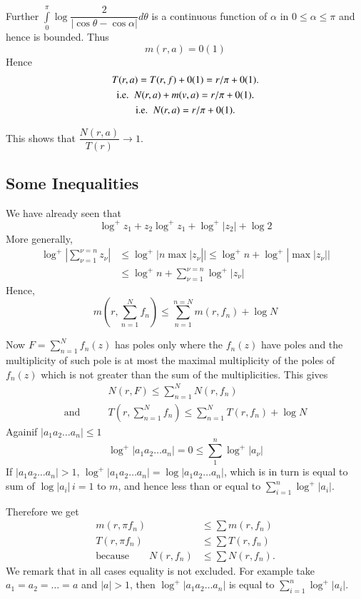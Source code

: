 Further\pageoriginale \;
$\int\limits^{\pi}_{0}\log\dfrac{2}{|\cos\theta-\cos\alpha|}d\theta$ \;
is a continuous function of $\alpha$ in $0\leq \alpha\leq\pi$ and
hence is bounded. Thus
$$
m(r,a)=0(1)
$$
Hence
\begin{gather*}
T(r,a)=T(r,f)+0(1)=r/\pi+0(1).\\
\text{{i.e.}\kern.3em\ } N(r,a)+m(v,a)=r/\pi+0(1).\\
\text{{i.e.}\kern.3em\ } N(r,a)=r/\pi+0(1).
\end{gather*}

This shows that $\dfrac{N(r,a)}{T(r)}\to 1$.

\subsection{Some Inequalities}\label{part1-sec1.4}

We have already seen that
$$
\log^{+}z_{1}+z_{2}\log^{+}z_{1}+\log^{+}|z_{2}|+\log 2
$$
More generally,
\begin{align*}
\log^{+}\left|\sum^{\nu=n}_{\nu=1}z_{\nu}\right| &\leq
\log^{+}|n\max|z_{\nu}|\Big|\leq \log^{+}n+\log^{+}|\max |z_{\nu}|\Big|\\
&\leq \log^{+}n+\sum^{\nu=n}_{\nu=1}\log^{+}|z_{\nu}|
\end{align*}
Hence,
$$
m\left(r,\sum^{N}_{n=1}f_{n}\right)\leq \sum^{n=N}_{n=1}m(r,f_{n})+\log N
$$

Now $F=\sum\limits^{N}_{n=1}f_{n}(z)$ has poles only where the
$f_{n}(z)$ have poles and the multiplicity of such pole is at most the
maximal multiplicity of the poles of $f_{n}(z)$ which is not greater
than the sum of the multiplicities. This gives
\begin{align*}
& N(r,F)\leq \sum^{N}_{n=1}N(r,f_{n})\\
\text{and}\qquad & T\left(r,\sum^{N}_{n=1}f_{n}\right)\leq
\sum^{N}_{n=1}T(r,f_{n})+\log N
\end{align*}
Again\pageoriginale if $|a_{1}a_{2}\ldots a_{n}|\leq 1$
$$
\log^{+}|a_{1}a_{2}\ldots a_{n}|=0\leq \sum^{n}_{1}\log^{+}|a_{\nu}|
$$
If $|a_{1}a_{2}\ldots a_{n}|>1$, $\log^{+}|a_{1}a_{2}\ldots
a_{n}|=\log |a_{1}a_{2}\ldots a_{n}|$, which is in turn is equal to sum
of $\log |a_{i}|\,i=1$ to $m$, and hence less than or equal to
$\sum\limits^{n}_{i=1}\log^{+}|a_{i}|$.

Therefore we get
\begin{align*}
m(r,\pi f_{n}) &\leq \sum m(r,f_{n})\\
T(r,\pi f_{n}) &\leq \sum T(r,f_{n})\\
\text{because}\qquad N(r,f_{n}) &\leq \sum N(r,f_{n}).
\end{align*}
We remark that in all cases equality is not excluded. For example take
$a_{1}=a_{2}=\ldots=a$ and $|a|>1$, then $\log^{+}|a_{1}a_{2}\ldots
a_{n}|$ is equal to $\sum\limits^{n}_{i=1}\log^{+}|a_{i}|$.

